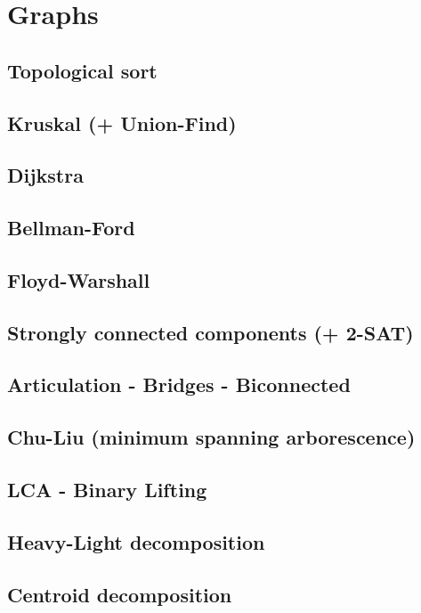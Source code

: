 \section{Graphs}
\subsection{Topological sort}
\subsection{Kruskal (+ Union-Find)}
\subsection{Dijkstra}
\subsection{Bellman-Ford}
\subsection{Floyd-Warshall}
\subsection{Strongly connected components (+ 2-SAT)}
\subsection{Articulation - Bridges - Biconnected}
\subsection{Chu-Liu (minimum spanning arborescence)}
\subsection{LCA - Binary Lifting}
\subsection{Heavy-Light decomposition}
\subsection{Centroid decomposition}

